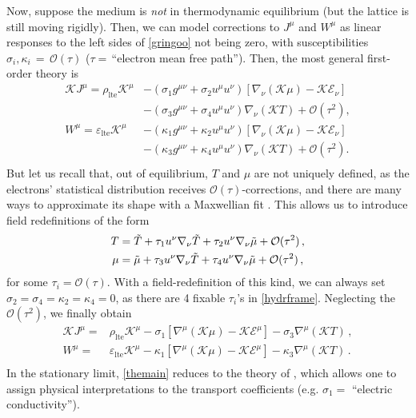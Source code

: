 \documentclass[a4paper, amsfonts, amssymb, amsmath, reprint, showkeys, nofootinbib, twoside,notitlepage]{revtex4-1}
\newcommand{\K}{{\mathcal{K}}}
\theoremstyle{definition}
\theoremstyle{theorem}
\begin{document}
\newpage
Now, suppose the medium is \textit{not} in thermodynamic equilibrium (but the lattice is still moving rigidly). Then, we can model corrections to $J^\mu$ and $W^\mu$ as linear responses to the left sides of \eqref{gringoo} not being zero, with susceptibilities $\sigma_i,\kappa_i\,{=}\,\mathcal{O}(\tau)$ ($\tau=\,$``electron mean free path''). Then, the most general first-order theory is
\begin{equation}\label{original}
\begin{split}
\K J^\mu {=}\rho_{\text{lte}} \K^\mu & {-}(\sigma_1 g^{\mu \nu}{+}\sigma_2 u^\mu u^\nu) [\nabla_\nu (\K\mu){-}\K\mathcal{E}_\nu] \\
& {-}(\sigma_3 g^{\mu \nu}{+}\sigma_4 u^\mu u^\nu) \nabla_\nu (\K T) +\mathcal{O}(\tau^2) , \\
W^\mu {=}\varepsilon_{\text{lte}} \K^\mu & {-}(\kappa_1 g^{\mu \nu}{+}\kappa_2 u^\mu u^\nu) [\nabla_\nu (\K\mu){-}\K \mathcal{E}_\nu] \\
& {-}(\kappa_3 g^{\mu \nu}{+}\kappa_4 u^\mu u^\nu) \nabla_\nu (\K T) +\mathcal{O}(\tau^2). \\
\end{split}
\end{equation}
But let us recall that, out of equilibrium, $T$ and $\mu$ are not uniquely defined, as the electrons' statistical distribution receives $\mathcal{O}(\tau)$-corrections, and there are many ways to approximate its shape with a Maxwellian fit \cite{KovtunTemperature2022vas,Weinberg1971,GavassinoInfiniteOrded2024pgl}. This allows us to introduce field redefinitions of the form \cite{GavassinoAntonelli:2025umq}
\begin{equation}\label{hydrframe}
\begin{split}
T={}& \Tilde{T}+\tau_1 u^\nu \nabla_\nu \Tilde{T} +\tau_2 u^\nu \nabla_\nu \Tilde{\mu}+\mathcal{O}(\tau^2) \, , \\
\mu={}& \Tilde{\mu}+\tau_3 u^\nu \nabla_\nu \Tilde{T} +\tau_4 u^\nu \nabla_\nu \Tilde{\mu}+\mathcal{O}(\tau^2) \, , \\
\end{split}
\end{equation}
for some $\tau_i {=}\mathcal{O}(\tau)$. With a field-redefinition of this kind, we can always set $\sigma_2{=}\sigma_4{=}\kappa_2{=}\kappa_4{=}0$, as there are 4 fixable $\tau_i$'s in \eqref{hydrframe}. Neglecting the $\mathcal{O}(\tau^2)$, we finally obtain
\begin{equation}\label{themain}
\begin{split}
\K J^\mu ={}& \rho_{\text{lte}} \K^\mu  -\sigma_1 [\nabla^\mu (\K\mu){-}\K\mathcal{E}^\mu] -\sigma_3 \nabla^\mu (\K T) \, , \\
W^\mu ={}& \varepsilon_{\text{lte}} \K^\mu  -\kappa_1 [\nabla^\mu (\K\mu){-}\K \mathcal{E}^\mu] -\kappa_3  \nabla^\mu (\K T) \, . \\
\end{split}
\end{equation}
In the stationary limit, \eqref{themain} reduces to the theory of \cite{Anandan1984}, which allows one to assign physical interpretations to the transport coefficients (e.g. $\sigma_1 =$ ``electric conductivity'').
\end{document}
